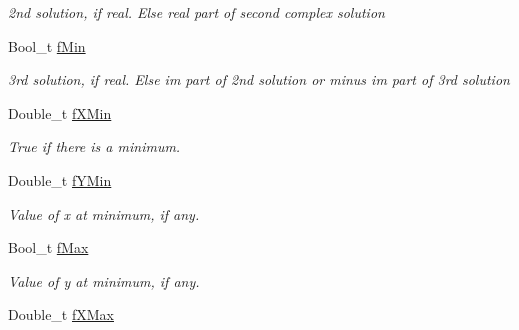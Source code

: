 \begin{DoxyCompactItemize}
\begin{DoxyCompactList}\small\item\em 2nd solution, if real. Else real part of second complex solution \item\end{DoxyCompactList}\item 
\hypertarget{classTPoly3_a9edebc9d273d22284e2ee4af3959420a}{
Bool\_\-t \hyperlink{classTPoly3_a9edebc9d273d22284e2ee4af3959420a}{fMin}}
\label{classTPoly3_a9edebc9d273d22284e2ee4af3959420a}

\begin{DoxyCompactList}\small\item\em 3rd solution, if real. Else im part of 2nd solution or minus im part of 3rd solution \item\end{DoxyCompactList}\item 
\hypertarget{classTPoly3_a6879c49799a99d0a4d9154052a039276}{
Double\_\-t \hyperlink{classTPoly3_a6879c49799a99d0a4d9154052a039276}{fXMin}}
\label{classTPoly3_a6879c49799a99d0a4d9154052a039276}

\begin{DoxyCompactList}\small\item\em True if there is a minimum. \item\end{DoxyCompactList}\item 
\hypertarget{classTPoly3_a4002b988036dff8808a61fee18059314}{
Double\_\-t \hyperlink{classTPoly3_a4002b988036dff8808a61fee18059314}{fYMin}}
\label{classTPoly3_a4002b988036dff8808a61fee18059314}

\begin{DoxyCompactList}\small\item\em Value of x at minimum, if any. \item\end{DoxyCompactList}\item 
\hypertarget{classTPoly3_a2bd791e554962454fa935c03cf9c98d2}{
Bool\_\-t \hyperlink{classTPoly3_a2bd791e554962454fa935c03cf9c98d2}{fMax}}
\label{classTPoly3_a2bd791e554962454fa935c03cf9c98d2}

\begin{DoxyCompactList}\small\item\em Value of y at minimum, if any. \item\end{DoxyCompactList}\item 
\hypertarget{classTPoly3_ab444bc80192871506c9c847cacc86c43}{
Double\_\-t \hyperlink{classTPoly3_ab444bc80192871506c9c847cacc86c43}{fXMax}}
\label{classTPoly3_ab444bc80192871506c9c847cacc86c43}


\end{DoxyCompactItemize}
